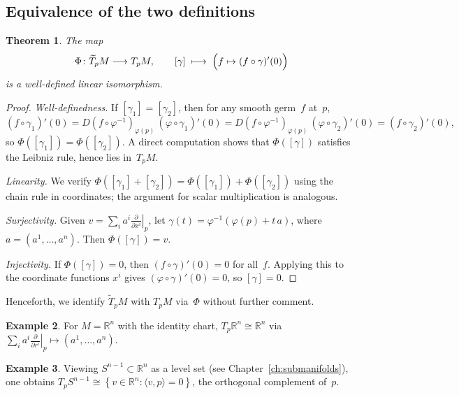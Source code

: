 \documentclass[12pt,a4paper,openany]{book}
\newtheorem{theorem}{Theorem}[section]
\theoremstyle{definition}
\newtheorem{example}[theorem]{Example}
\theoremstyle{remark}
\newcommand{\R}{\mathbb{R}}
\newcommand{\set}[1]{\left\{ #1 \right\}}
\begin{document}
\subsection{Equivalence of the two definitions}%
\label{ssec:equivalence-tangent}

\begin{theorem}\label{thm:tangent-equiv}%
The map
\[
  \Phi \colon \widetilde{T}_pM \longrightarrow T_pM,
  \qquad
  [\gamma] \;\longmapsto\;
  \Bigl( f \mapsto (f \circ \gamma)'(0) \Bigr)
\]
is a well-defined linear isomorphism.
\end{theorem}

\begin{proof}
\emph{Well-definedness.}
If $[\gamma_1] = [\gamma_2]$, then for any smooth germ~$f$ at~$p$,
\[
  (f \circ \gamma_1)'(0)
  = D(f \circ \varphi^{-1})_{\varphi(p)}\, (\varphi \circ \gamma_1)'(0)
  = D(f \circ \varphi^{-1})_{\varphi(p)}\, (\varphi \circ \gamma_2)'(0)
  = (f \circ \gamma_2)'(0),
\]
so $\Phi([\gamma_1]) = \Phi([\gamma_2])$.  A direct computation shows that
$\Phi([\gamma])$ satisfies the Leibniz rule, hence lies in~$T_pM$.

\emph{Linearity.}
We verify $\Phi([\gamma_1] + [\gamma_2]) = \Phi([\gamma_1]) +
\Phi([\gamma_2])$ using the chain rule in coordinates; the argument for
scalar multiplication is analogous.

\emph{Surjectivity.}
Given $v = \sum_i a^i \left.\frac{\partial}{\partial x^i}\right|_p$, let
$\gamma(t) = \varphi^{-1}(\varphi(p) + t\, a)$, where $a = (a^1, \dots,
a^n)$.  Then $\Phi([\gamma]) = v$.

\emph{Injectivity.}
If $\Phi([\gamma]) = 0$, then $(f \circ \gamma)'(0) = 0$ for all~$f$.
Applying this to the coordinate functions $x^i$ gives
$(\varphi \circ \gamma)'(0) = 0$, so $[\gamma] = 0$.
\end{proof}

Henceforth, we identify $\widetilde{T}_pM$ with $T_pM$ via~$\Phi$
without further comment.

\begin{example}\label{ex:tangent-Rn}%
For $M = \R^n$ with the identity chart, $T_p\R^n \cong \R^n$ via
$\sum_i a^i \left.\frac{\partial}{\partial r^i}\right|_p \mapsto
(a^1, \dots, a^n)$.
\end{example}

\begin{example}\label{ex:tangent-Sn}%
Viewing $S^{n-1} \subset \R^n$ as a level set (see
Chapter~\ref{ch:submanifolds}), one obtains
$T_pS^{n-1} \cong \set{v \in \R^n : \langle v, p \rangle = 0}$,
the orthogonal complement of~$p$.
\end{example}
\end{document}
